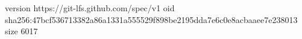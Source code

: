 version https://git-lfs.github.com/spec/v1
oid sha256:47bcf536713382a86a1331a555529f898be2195dda7e6c0e8acbaaee7e238013
size 6017
